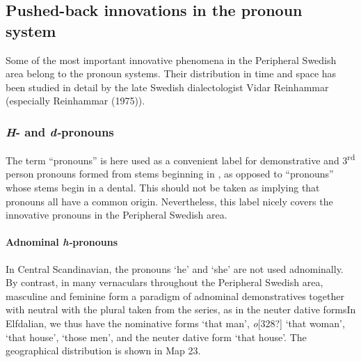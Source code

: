 \subsection[Pushed{}-back innovations in the pronoun system]{\rmfamily Pushed-back innovations in the pronoun system}
Some of the most important innovative phenomena in the Peripheral Swedish area belong to the pronoun systems. Their distribution in time and space has been studied in detail by the late Swedish dialectologist Vidar Reinhammar (especially Reinhammar (1975)). 

\subsubsection[H{}- and d{}-pronouns]{\textit{H}{}- and \textit{d-}pronouns}
The term “pronouns” is here used as a convenient label for demonstrative and 3\textsuperscript{rd} person pronouns formed from stems beginning in , as opposed to “pronouns” whose stems begin in a dental. This should not be taken as implying that pronouns all have a common origin. Nevertheless, this label nicely covers the innovative pronouns in the Peripheral Swedish area.

\paragraph[Adnominal h{}-pronouns]{Adnominal \textit{h-}pronouns}
In Central Scandinavian, the pronouns  ‘he’ and  ‘she’ are not used adnominally. By contrast, in many vernaculars throughout the Peripheral Swedish area, masculine  and feminine  form a paradigm of adnominal demonstratives together with neutral with the plural taken from the series, as in the neuter dative formsIn Elfdalian, we thus have the nominative forms  ‘that man’, \textit{o}[328?] ‘that woman’,  ‘that house’,  ‘those men’, and the neuter dative form ‘that house’. The geographical distribution is shown in Map 23. 

